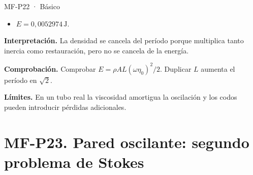 \begin{studiumworked}{MF-P22 · Básico}
\begin{itemize}
\item $E=0{,}0052974\,\mathrm{J}$.

\end{itemize}

\textbf{Interpretación.} La densidad se cancela del período porque multiplica tanto inercia como restauración, pero no se cancela de la energía.

\textbf{Comprobación.} Comprobar $E=\rho AL(\omega\eta_0)^2/2$. Duplicar $L$ aumenta el período en $\sqrt2$.

\textbf{Límites.} En un tubo real la viscosidad amortigua la oscilación y los codos pueden introducir pérdidas adicionales.

\end{studiumworked}



\Needspace{.30\textheight}\section{MF-P23. Pared oscilante: segundo problema de Stokes}

